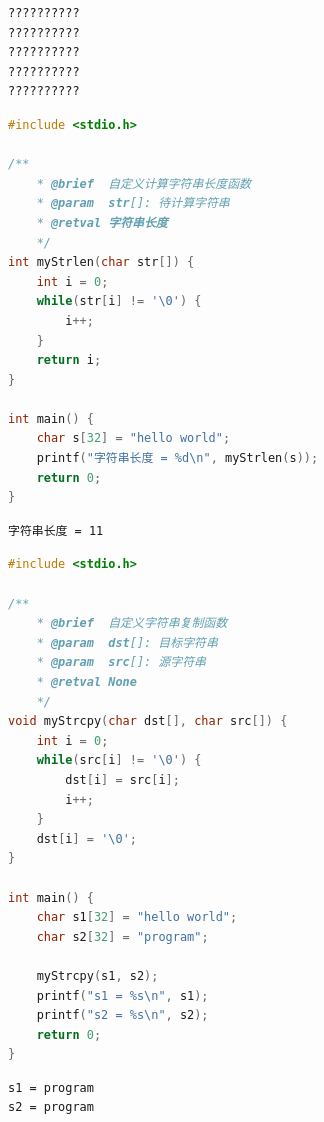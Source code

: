 \begin{tcolorbox}
	\begin{verbatim}
??????????
??????????
??????????
??????????
??????????
	\end{verbatim}
\end{tcolorbox}

\vspace{0.5cm}


\begin{lstlisting}[language=C]
#include <stdio.h>

/**
	* @brief  自定义计算字符串长度函数
	* @param  str[]: 待计算字符串
	* @retval 字符串长度
	*/
int myStrlen(char str[]) {
	int i = 0;
	while(str[i] != '\0') {
		i++;
	}
	return i;
}

int main() {
	char s[32] = "hello world";
	printf("字符串长度 = %d\n", myStrlen(s));
	return 0;
}
\end{lstlisting}

\begin{tcolorbox}
	\begin{verbatim}
字符串长度 = 11
	\end{verbatim}
\end{tcolorbox}

\vspace{0.5cm}


\begin{lstlisting}[language=C]
#include <stdio.h>

/**
	* @brief  自定义字符串复制函数
	* @param  dst[]: 目标字符串
	* @param  src[]: 源字符串
	* @retval None
	*/
void myStrcpy(char dst[], char src[]) {
	int i = 0;
	while(src[i] != '\0') {
		dst[i] = src[i];
		i++;
	}
	dst[i] = '\0';
}

int main() {
	char s1[32] = "hello world";
	char s2[32] = "program";

	myStrcpy(s1, s2);
	printf("s1 = %s\n", s1);
	printf("s2 = %s\n", s2);
	return 0;
}
\end{lstlisting}

\begin{tcolorbox}
	\begin{verbatim}
s1 = program
s2 = program
	\end{verbatim}
\end{tcolorbox}

\vspace{0.5cm}

